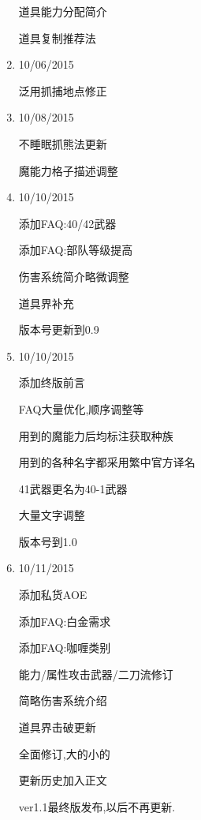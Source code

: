 \begin{enumerate}
		道具能力分配简介

		道具复制推荐法

		\item
		10/06/2015

		泛用抓捕地点修正

		\item
		10/08/2015

		不睡眠抓熊法更新

		魔能力格子描述调整

		\item
		10/10/2015

		添加FAQ:40/42武器

		添加FAQ:部队等级提高

		伤害系统简介略微调整

		道具界补充

		版本号更新到0.9

		\item
		10/10/2015

		添加终版前言

		FAQ大量优化,顺序调整等

		用到的魔能力后均标注获取种族

		用到的各种名字都采用繁中官方译名

		41武器更名为40-1武器

		大量文字调整

		版本号到1.0

		\item
		10/11/2015

		添加私货AOE

		添加FAQ:白金需求

		添加FAQ:咖喱类别

		能力/属性攻击武器/二刀流修订

		简略伤害系统介绍

		道具界击破更新

		全面修订,大的小的

		更新历史加入正文

		ver1.1最终版发布,以后不再更新.

	\end{enumerate}
	

	\newpage

